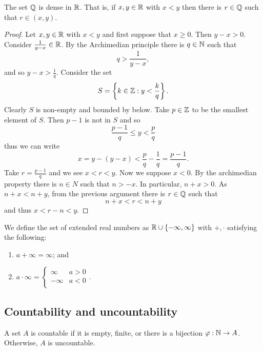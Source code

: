 

\begin{proposition}[]
	The set $\mathbb{Q}$ is dense in $\mathbb{R}$.
	That is, if $x, y \in \mathbb{R}$
	with $x < y$ then there is $r \in \mathbb{Q}$ such that
	$r \in (x,y)$.
\end{proposition}

\begin{proof}
	Let $x, y \in \mathbb{R}$ with $x < y$
	and first suppose that $x \geq 0$.
	Then $y - x > 0$.
	Consider $\frac1{y-x} \in \mathbb{R}$.
	By the Archimedian principle there is $q \in \mathbb{N}$
	such that \[
		q > \frac{1}{y-x},
	\]
	and so $y - x > \frac1q$.
	Consider the set \[
		S = \left\{ k \in \mathbb{Z}: y < \frac{k}{q} \right\}.
	\]
	Clearly $S$ is non-empty and bounded by below.
	Take $p \in \mathbb{Z}$ to be the smallest element of $S$.
	Then $p - 1$ is not in $S$ and so \[
		\frac{p-1}{q} \leq y < \frac{p}{q}
	\]
	thus we can write \[
		x = y - (y - x) < \frac pq - \frac1q = \frac{p-1}{q}.
	\]
	Take $r = \frac{p-1}q$ and we see $x < r < y$.
	Now we suppose $x < 0$.
	By the archimedian property there is $n \in N$
	such that $n > -x$.
	In particular, $n + x > 0$.
	As $n + x < n + y$,
	from the previous argument there is $r \in \mathbb{Q}$ such that \[
		n + x < r < n + y
	\]
	and thus $x < r - n < y$.
\end{proof}

\begin{definition}[]
	We define the set of extended real numbers as 
	$\mathbb{R} \cup \left\{ -\infty, \infty \right\}$
	with $+, \cdot$ satisfying the following:
	\begin{enumerate}
		\item $a + \infty = \infty$; and
		\item $a \cdot \infty = \begin{cases}
				\infty  & a > 0 \\
				-\infty & a < 0 \\
		\end{cases}$.
	\end{enumerate}
\end{definition}


\subsection{Countability and uncountability}

\begin{definition}[]
	A set $A$ is countable if it is empty, 
	finite, 
	or there is a bijection
	$\varphi: \mathbb{N} \to A$.
	Otherwise, $A$ is uncountable.
\end{definition}


